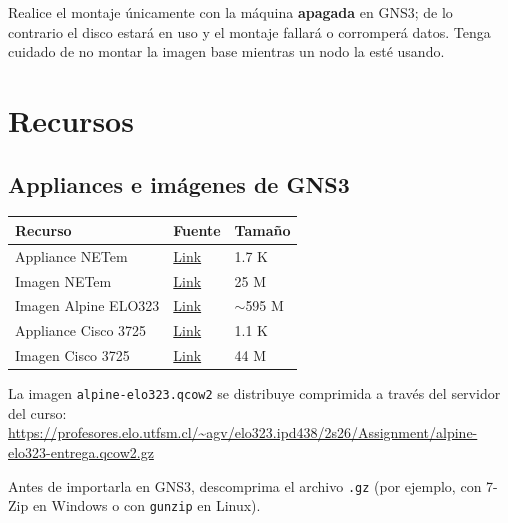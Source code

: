 \documentclass[letterpaper,12pt]{article}
\begin{document}
\begin{nota}
Realice el montaje únicamente con la máquina \textbf{apagada} en GNS3; de lo contrario el disco estará en uso y el montaje fallará o corromperá datos. Tenga cuidado de no montar la imagen base mientras un nodo la esté usando.
\end{nota}

\section{Recursos}

\subsection{Appliances e imágenes de GNS3}

\begin{center}
\renewcommand{\arraystretch}{1.3}
\begin{tabularx}{\textwidth}{|l|X|l|}
    \hline
    \textbf{Recurso} & \textbf{Fuente} & \textbf{Tamaño} \\ \hline
    Appliance NETem & \href{https://www.gns3.com/marketplace/appliance/netem}{Link} & 1.7 K \\ \hline
    Imagen NETem & \href{https://github.com/phobozad/NETem/releases/download/v4.1/NETem-v4.1.qcow2}{Link} & 25 M \\ \hline
    Imagen Alpine ELO323 & \href{https://profesores.elo.utfsm.cl/\string~agv/elo323.ipd438/2s26/Assignment/alpine-elo323-entrega.qcow2.gz}{Link} & $\sim$595 M \\ \hline
    Appliance Cisco 3725 & \href{https://gns3.com/marketplace/appliances/cisco-3725}{Link} & 1.1 K \\ \hline
    Imagen Cisco 3725 & \href{https://archive.org/download/c2691-adventerprisek9-mz.124-15.T14/c3725-adventerprisek9-mz.124-15.T14.bin}{Link} & 44 M \\ \hline
\end{tabularx}
\end{center}

La imagen \texttt{alpine-elo323.qcow2} se distribuye comprimida a través del servidor del curso: \\
\url{https://profesores.elo.utfsm.cl/~agv/elo323.ipd438/2s26/Assignment/alpine-elo323-entrega.qcow2.gz}

Antes de importarla en GNS3, descomprima el archivo \texttt{.gz} (por ejemplo, con 7-Zip en Windows o con \texttt{gunzip} en Linux).
\end{document}
